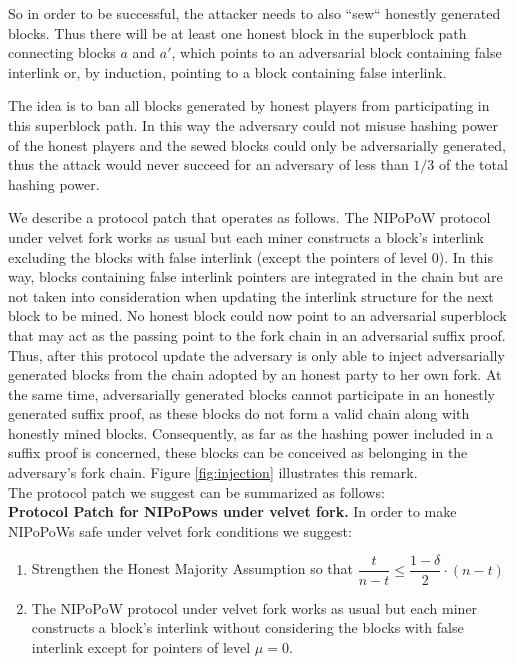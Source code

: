 So in order to be successful, the attacker needs to also ``sew`` honestly generated blocks. Thus there will be at least one honest block in the superblock path connecting blocks $a$ and $a'$, which points to an adversarial block containing false interlink or, by induction, pointing to a block containing false interlink.

The idea is to ban all blocks generated by honest players from participating in this superblock path. In this way the adversary could not misuse hashing power of the honest players and the sewed blocks could only be adversarially generated, thus the attack would never succeed for an adversary of less than $1/3$ of the total hashing power. 

We describe a protocol patch that operates as follows. The NIPoPoW protocol under velvet fork works as usual but each miner constructs a block's interlink excluding the blocks with false interlink (except the pointers of level 0). In this way, blocks containing false interlink pointers are integrated in the chain but are not taken into consideration when updating the interlink structure for the next block to be mined. No honest block could now point to an adversarial superblock that may act as the passing point to the fork chain in an adversarial suffix proof. 
Thus, after this protocol update the adversary is only able to inject adversarially generated blocks from the chain adopted by an honest party to her own fork.
At the same time, adversarially generated blocks cannot participate in an honestly generated suffix proof, as these blocks do not form a valid chain along with honestly mined blocks. Consequently, as far as the hashing power included in a suffix proof is concerned, these blocks can be conceived as belonging in the adversary's fork chain. Figure \ref{fig:injection} illustrates this remark.\\
The protocol patch we suggest can be summarized as follows:\\


\textbf{Protocol Patch for NIPoPows under velvet fork.} In order to make NIPoPoWs safe under velvet fork conditions we suggest:
\begin{enumerate}
\item Strengthen the Honest Majority Assumption so that $\dfrac{t}{n-t} \leq \dfrac{1-\delta}{2} \cdot (n-t)$
\item The NIPoPoW protocol under velvet fork works as usual but each miner constructs a block's interlink without considering the blocks with false interlink except for pointers of level $\mu = 0$.
\end{enumerate}

